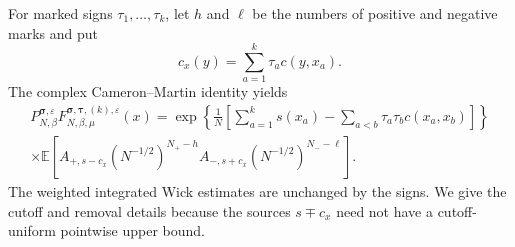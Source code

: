 \documentclass[11pt,reqno]{amsart}
\numberwithin{equation}{section}
\theoremstyle{plain}
\theoremstyle{definition}
\newcommand{\E}{\mathbb E}
\newcommand{\be}{\beta}
\newcommand{\vep}{\varepsilon}
\begin{document}
For marked signs $\tau_1,\ldots,\tau_k$, let $h$ and $\ell$ be the numbers of positive and negative marks and put
\begin{equation}\label{rep:eq:cx-arbitrary}
 c_x(y)=\sum_{a=1}^k\tau_a c(y,x_a).
\end{equation}
The complex Cameron--Martin identity yields
\begin{multline}\label{rep:eq:arbitrary-marked-field}
 P_{N,\be}^{\boldsymbol\sigma,\vep}
 F_{N,\be,\mu}^{\boldsymbol\sigma,\boldsymbol\tau,(k),\vep}(x)
 =\exp\left\{\frac1N\left[
 \sum_{a=1}^ks(x_a)-\sum_{a<b}\tau_a\tau_bc(x_a,x_b)
 \right]\right\}\\
 \times\E\left[
 A_{+,s-c_x}(N^{-1/2})^{N_+-h}
 A_{-,s+c_x}(N^{-1/2})^{N_--\ell}
 \right].
\end{multline}
The weighted integrated Wick estimates are unchanged by the signs.  We give the cutoff and removal details because the sources $s\mp c_x$ need not have a cutoff-uniform pointwise upper bound.
\end{document}
